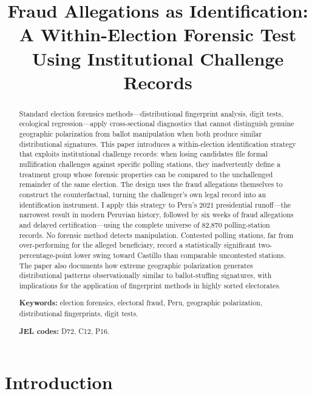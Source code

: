 \documentclass[12pt]{article}
\title{Fraud Allegations as Identification:\\
       A Within-Election Forensic Test Using Institutional Challenge Records}
\author{}
\date{}
\begin{document}
\maketitle
\thispagestyle{empty}

\begin{abstract}
\noindent
\begin{onehalfspacing}
Standard election forensics methods---distributional fingerprint analysis,
digit tests, ecological regression---apply cross-sectional diagnostics that
cannot distinguish genuine geographic polarization from ballot manipulation
when both produce similar distributional signatures. This paper introduces a
within-election identification strategy that exploits institutional challenge
records: when losing candidates file formal nullification challenges against
specific polling stations, they inadvertently define a treatment group whose
forensic properties can be compared to the unchallenged remainder of the same
election. The design uses the fraud allegations themselves to construct the
counterfactual, turning the challenger's own legal record into an
identification instrument. I apply this strategy to Peru's 2021 presidential
runoff---the narrowest result in modern Peruvian history, followed by six
weeks of fraud allegations and delayed certification---using the complete
universe of 82,870 polling-station records. No forensic method detects
manipulation. Contested polling stations, far from over-performing for the
alleged beneficiary, record a statistically significant two-percentage-point
lower swing toward Castillo than comparable uncontested stations. The paper
also documents how extreme geographic polarization generates distributional
patterns observationally similar to ballot-stuffing signatures, with
implications for the application of fingerprint methods in highly sorted
electorates.
\end{onehalfspacing}

\medskip
\noindent\textbf{Keywords:} election forensics, electoral fraud, Peru,
geographic polarization, distributional fingerprints, digit tests.

\medskip
\noindent\textbf{JEL codes:} D72, C12, P16.
\end{abstract}

\newpage

\section{Introduction}
\label{sec:intro}
\end{document}
